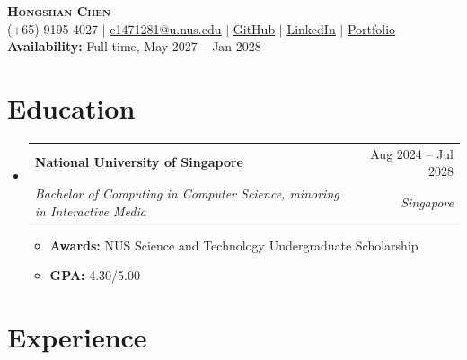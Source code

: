 \documentclass[letterpaper,10pt]{article}
\makeatletter
\newcommand{\resumeItem}[1]{%
  \item\small{{#1}}%
}
\newcommand{\resumeSubheading}[4]{
  \vspace{2pt}\item
    \begin{tabular*}{0.97\textwidth}[t]{l@{\extracolsep{\fill}}r}
      \textbf{#1} & #2 \\
      \textit{\small #3} & \textit{\small #4} \\
    \end{tabular*}\vspace{-3pt}
}
\newcommand{\resumeSubHeadingListStart}{
  \begin{itemize}[leftmargin=0.15in, label={}, topsep=0pt, partopsep=0pt,
                  parsep=0pt, itemsep=0pt]
}
\newcommand{\resumeSubHeadingListEnd}{
  \end{itemize}
}
\newcommand{\resumeItemListStart}{
  \begin{itemize}[leftmargin=0.15in, itemsep=1pt, parsep=0pt, topsep=4pt, partopsep=0pt]
}
\newcommand{\resumeItemListEnd}{
  \end{itemize}
}
\makeatother
\begin{document}
\begin{center}
    \textbf{\Huge \scshape Hongshan Chen} \\ \vspace{2pt}
    \small
    (+65) 9195 4027 $|$
    \href{mailto:e1471281@u.nus.edu}{\underline{e1471281@u.nus.edu}} $|$
    \href{https://github.com/ChenHongshan333}{\underline{GitHub}} $|$
    \href{https://www.linkedin.com/in/hongshan-chen-606928366/}{\underline{LinkedIn}} $|$
    \href{https://chenhongshan333.github.io/}{\underline{Portfolio}}
    \\ \vspace{2pt}
    \small
    \textbf{Availability:} Full-time, May 2027 -- Jan 2028
\end{center}

\vspace{-12pt}


\section{Education}

\resumeSubHeadingListStart

  \resumeSubheading
    {National University of Singapore}{Aug 2024 -- Jul 2028}
    {Bachelor of Computing in Computer Science, minoring in Interactive Media}{Singapore}

    \resumeItemListStart


      
      \resumeItem{
        \textbf{Awards:} NUS Science and Technology Undergraduate Scholarship
      }%

       
      \resumeItem{
        \textbf{GPA:} 4.30/5.00
      }%
      

    \resumeItemListEnd

\resumeSubHeadingListEnd


\section{Experience}
\end{document}
